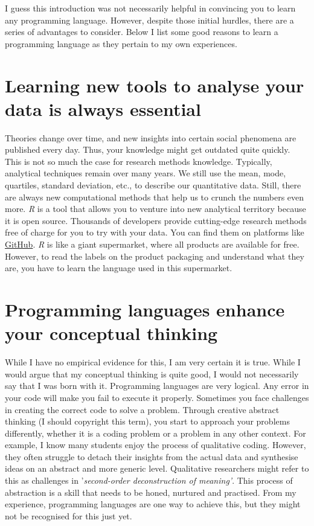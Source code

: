 \documentclass[
]{book}
\begin{document}
I guess this introduction was not necessarily helpful in convincing you to learn any programming language. However, despite those initial hurdles, there are a series of advantages to consider. Below I list some good reasons to learn a programming language as they pertain to my own experiences.

\hypertarget{learning-new-tools-to-analyse-your-data-is-always-essential}{%
\section{Learning new tools to analyse your data is always essential}\label{learning-new-tools-to-analyse-your-data-is-always-essential}}

Theories change over time, and new insights into certain social phenomena are published every day. Thus, your knowledge might get outdated quite quickly. This is not so much the case for research methods knowledge. Typically, analytical techniques remain over many years. We still use the mean, mode, quartiles, standard deviation, etc., to describe our quantitative data. Still, there are always new computational methods that help us to crunch the numbers even more. \emph{R} is a tool that allows you to venture into new analytical territory because it is open source. Thousands of developers provide cutting-edge research methods free of charge for you to try with your data. You can find them on platforms like \href{https://github.com}{GitHub}. \emph{R} is like a giant supermarket, where all products are available for free. However, to read the labels on the product packaging and understand what they are, you have to learn the language used in this supermarket.

\hypertarget{programming-languages-enhance-your-conceptual-thinking}{%
\section{Programming languages enhance your conceptual thinking}\label{programming-languages-enhance-your-conceptual-thinking}}

While I have no empirical evidence for this, I am very certain it is true. While I would argue that my conceptual thinking is quite good, I would not necessarily say that I was born with it. Programming languages are very logical. Any error in your code will make you fail to execute it properly. Sometimes you face challenges in creating the correct code to solve a problem. Through creative abstract thinking (I should copyright this term), you start to approach your problems differently, whether it is a coding problem or a problem in any other context. For example, I know many students enjoy the process of qualitative coding. However, they often struggle to detach their insights from the actual data and synthesise ideas on an abstract and more generic level. Qualitative researchers might refer to this as challenges in '\emph{second-order deconstruction of meaning'}. This process of abstraction is a skill that needs to be honed, nurtured and practised. From my experience, programming languages are one way to achieve this, but they might not be recognised for this just yet.
\end{document}
